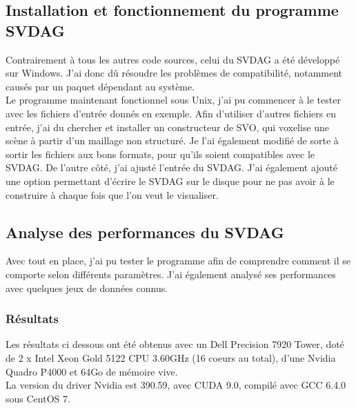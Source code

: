 \documentclass[12pt,a4paper,twoside]{article}
\begin{document}
    \subsection{Installation et fonctionnement du programme SVDAG}

    Contrairement à tous les autres code sources, celui du SVDAG a été développé sur Windows. J'ai donc dû résoudre les problèmes
    de compatibilité, notamment causés par un paquet dépendant au système. \\
    Le programme maintenant fonctionnel sous Unix, j'ai pu commencer à le tester avec les fichiers d'entrée donnés en exemple.
    Afin d'utiliser d'autres fichiers en entrée, j'ai du chercher et installer un constructeur de SVO, qui voxelise une
    scène à partir d'un maillage non structuré. Je l'ai également
    modifié de sorte à sortir les fichiers aux bons formats, pour qu'ils soient compatibles avec le SVDAG.
    De l'autre côté, j'ai ajusté l'entrée du SVDAG. J'ai également ajouté une option permettant d'écrire le SVDAG sur
    le disque pour ne pas avoir à le construire à chaque fois que l'on veut le visualiser.


    \subsection{Analyse des performances du SVDAG}

    Avec tout en place, j'ai pu tester le programme afin de comprendre comment il se comporte selon différents
    paramètres. J'ai également analysé ses performances avec quelques jeux de données connus.

    \subsubsection{Résultats}

    Les résultats ci dessous ont été obtenus avec un Dell Precision 7920 Tower, doté de 2 x Intel Xeon Gold 5122 CPU 3.60GHz (16 coeurs au total),
    d'une Nvidia Quadro P4000 et 64Go de mémoire vive.\\
    La version du driver Nvidia est 390.59, avec CUDA 9.0, compilé avec GCC 6.4.0 sous CentOS 7.
\end{document}
